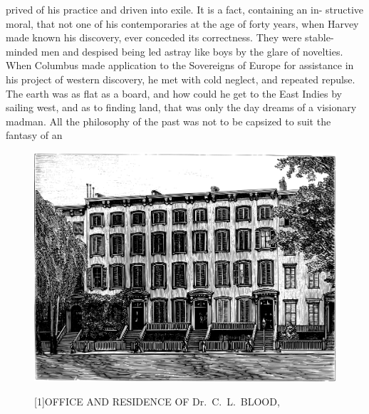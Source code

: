 \documentclass[10pt]{article}
\begin{document}
\begin{multicols}{3}
	prived of his practice and driven into exile. It is a fact, containing an in-\linebreak
	structive moral, that not one of his contemporaries at the age of forty years,\linebreak
	when Harvey made known his discovery, ever conceded its correctness.\linebreak
	They were stable-minded men and despised being led astray like boys by\linebreak
	the glare of novelties. When Columbus made application to the Sovereigns\linebreak
	of Europe for assistance in his project of western discovery, he met\linebreak
	with cold neglect, and repeated repulse. The earth was as flat as a board,\linebreak
	and how could he get to the East Indies by sailing west, and as to finding\linebreak
	land, that was only the day dreams of a visionary madman. All the\linebreak
	philosophy of the past was not to be capsized to suit the fantasy of an
	\begin{figure}

		\centering

		\vspace{7mm}

		\hspace{-6mm}\includegraphics[width=207mm]{Office_and_residence_of_Dr_C_L_Blood.pdf}

		\Large \hspace{-6mm}\scalebox{1.15}[1]{OFFICE AND RESIDENCE OF Dr.~C.~L.~BLOOD,}


\end{figure}
\end{multicols}
\end{document}
